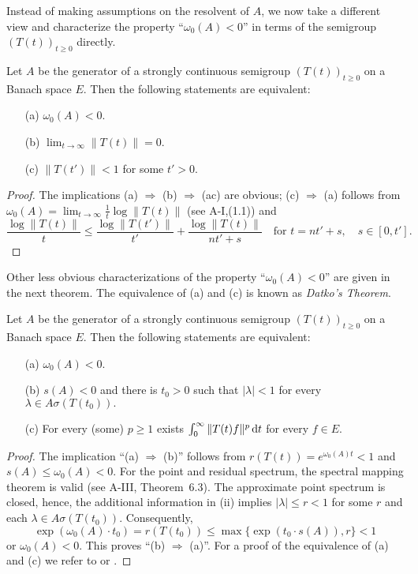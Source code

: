 Instead of making assumptions on the resolvent of $ A $, we now take a different view and characterize the property \enquote{$ \omega_0(A) < 0 $} in terms of the semigroup $ (T(t))_{t \geq 0} $ directly.
\begin{proposition} \label{prop:a4-1.10} Let $ A $ be the generator of a strongly continuous semigroup $ (T(t))_{t \geq 0} $ on a Banach space $E$. 
Then the following statements are equivalent:
\begin{itemize}
\item[(a)] $ \omega_0(A) < 0 $.
\item[(b)] $ \lim_{t \to \infty} \| T(t) \| = 0 $.
\item[(c)] $ \| T(t') \| < 1 $ for some $ t' > 0 $.
\end{itemize}
\end{proposition}

\begin{proof}
The implications (a) $ \Rightarrow $ (b) $ \Rightarrow $ (ac) are obvious; (c) $ \Rightarrow $ (a) follows from  $\omega_0(A) = \lim_{t \to \infty} \frac{1}{t} \log \| T(t) \|$ (see A-I,(1.1)) and  
\[
\displaystyle
\frac{\log \|T(t)\|}{t} \leq \frac{\log \|T(t')\|}{t'} + \frac{\log \|T(t)\|}{nt' + s} \quad \text{for } t = nt' + s, \quad s \in [0,t'].
\]
\end{proof}
 Other less obvious characterizations of the property ``$ \omega_0(A) < 0 $'' are given in the next theorem. 
The equivalence of (a) and (c) is known as \emph{Datko’s Theorem}.


\begin{theorem} \label{thm:a4-1.11} Let $ A $ be the generator of a strongly continuous semigroup $ (T(t))_{t \geq 0} $ on a Banach space $ E $. 
Then the following statements are equivalent:
\begin{itemize}
\item[(a)] $ \omega_0(A) < 0 $.
\item[(b)] $ s(A) < 0 $ and there is $ t_0 > 0 $ such that  
$
|\lambda| < 1$ for every $ \lambda \in A\sigma (T(t_0)).$
\item[(c)] For every (some) $ p \geq 1 $ exists $ \int_{0}^{\infty} \| T(t) f \|^p\mathop{}\!\mathrm{d}{t} $ for every $ f \in E $.
\end{itemize}
\end{theorem}

\begin{proof} The implication ``(a) $ \Rightarrow $ (b)'' follows from $ r(T(t)) = e^{\omega_0(A) t} < 1 $ and $ s(A) \leq \omega_0(A) < 0 $. For the point and residual spectrum, the spectral mapping theorem is valid (see A-III, Theorem~6.3). The approximate point spectrum is closed, hence, the additional information in (ii)
implies $ |\lambda| \leq r < 1 $ for some $ r $ and each $ \lambda \in A\sigma(T(t_0)) $. 
Consequently, 
\[
\exp(\omega_0(A) \cdot t_0) = r(T(t_0)) \leq \max\{\exp(t_0 \cdot s(A)), r\} < 1
\]
or $ \omega_0(A) < 0 $. 
This proves \textquotedblleft (b) $\Rightarrow$ (a)\textquotedblright. 
For a proof of the equivalence of (a) and (c) we refer to \citet{datko:1972} or \citet[Thm.4.4.1]{pazy:1983}. 
\end{proof}

